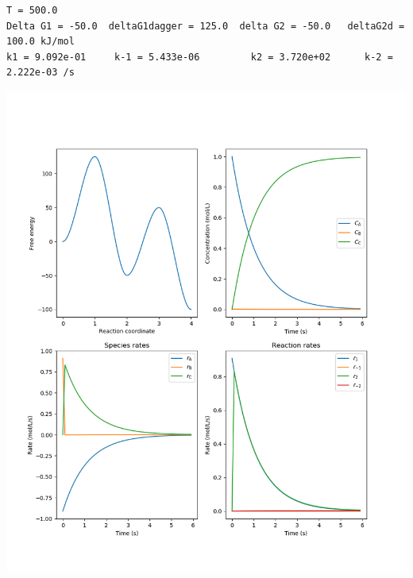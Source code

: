 \documentclass[11pt]{article}
\begin{document}
\begin{verbatim}
T = 500.0
Delta G1 = -50.0  deltaG1dagger = 125.0  delta G2 = -50.0   deltaG2d = 100.0 kJ/mol
k1 = 9.092e-01     k-1 = 5.433e-06         k2 = 3.720e+02      k-2 = 2.222e-03 /s
\end{verbatim}


\begin{center}
\includegraphics[width=.9\linewidth]{./Images/ABC-PSSA.png}
\end{center}
\end{document}
